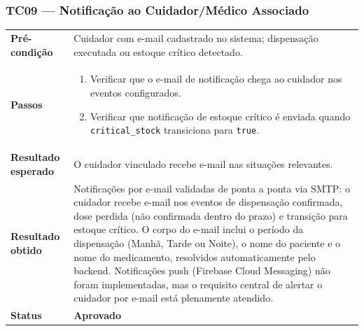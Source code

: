 \documentclass[12pt,a4paper]{article}
\newcommand{\lightrule}{\arrayrulecolor{gray!35}\midrule\arrayrulecolor{black}}
\newcommand{\aprovado}{\textcolor{green!60!black}{\textbf{Aprovado}}}
\begin{document}
\subsubsection{TC09 — Notificação ao Cuidador/Médico Associado}
\begin{table}[H]\small\setlength{\tabcolsep}{6pt}\renewcommand{\arraystretch}{1.3}
\begin{tabularx}{\textwidth}{>{\bfseries}p{4cm} X}
\toprule
Pré-condição & Cuidador com e-mail cadastrado no sistema; dispensação executada ou estoque crítico detectado. \\
\lightrule
Passos &
\begin{enumerate}[nosep,leftmargin=*]
  \item Verificar que o e-mail de notificação chega ao cuidador nos eventos configurados.
  \item Verificar que notificação de estoque crítico é enviada quando \texttt{critical\_stock} transiciona para \texttt{true}.
\end{enumerate} \\
\lightrule
Resultado esperado & O cuidador vinculado recebe e-mail nas situações relevantes. \\
\lightrule
Resultado obtido & Notificações por e-mail validadas de ponta a ponta via SMTP: o cuidador recebe e-mail nos eventos de dispensação confirmada, dose perdida (não confirmada dentro do prazo) e transição para estoque crítico. O corpo do e-mail inclui o período da dispensação (Manhã, Tarde ou Noite), o nome do paciente e o nome do medicamento, resolvidos automaticamente pelo backend. Notificações push (Firebase Cloud Messaging) não foram implementadas, mas o requisito central de alertar o cuidador por e-mail está plenamente atendido. \\
\lightrule
Status & \aprovado \\
\bottomrule
\end{tabularx}\end{table}
\end{document}
